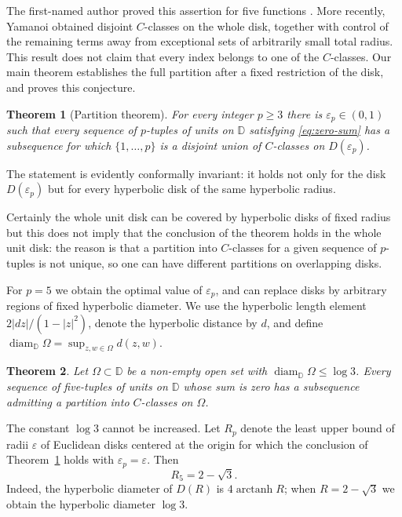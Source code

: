 \documentclass[12pt,letterpaper,reqno]{amsart}
\newtheorem{thm}{Theorem}[section]
\theoremstyle{definition}
\numberwithin{equation}{section}
\newcommand{\D}{\mathbb D}
\DeclareMathOperator{\diam}{diam}
\begin{document}
	The first-named author proved this assertion for five
	functions \cite{Ere96b}.
	More recently, Yamanoi \cite[Theorem~1.7]{Yam26} obtained disjoint
	$C$-classes on the whole disk, together with control of the
	remaining terms away from exceptional sets of arbitrarily small total
	radius. This result does not claim that every index belongs to one of
	the $C$-classes. Our main theorem establishes the full partition after a
	fixed restriction of the disk, and proves this conjecture.
	
	\begin{thm}[Partition theorem]\label{thm:main}
		For every integer $p\ge3$ there is $\varepsilon_p\in(0,1)$ such that
		every sequence of $p$-tuples of units on $\D$ satisfying
		\eqref{eq:zero-sum} has a subsequence for which $\{1,\ldots,p\}$ is a
		disjoint union of $C$-classes on $D(\varepsilon_p)$.
	\end{thm}
	
	The statement is evidently conformally invariant:
	it holds not only for the disk $D(\varepsilon_p)$ but for every hyperbolic disk
	of the same hyperbolic radius.
	
	Certainly the whole unit disk can be
	covered by hyperbolic disks of fixed radius
	but this does not imply that the conclusion of the theorem
	holds in the whole unit disk:
	the reason is that a partition into $C$-classes for a given sequence of
	$p$-tuples is not unique,
	so one can have different partitions on overlapping disks. 
	
	For $p=5$ we obtain the optimal value of $\varepsilon_p$, and can replace
	disks by arbitrary regions of fixed hyperbolic diameter.
	We use the hyperbolic length element
	$2|dz|/(1-|z|^2)$, denote the hyperbolic distance by $d$,
	and define $\diam_\D\Omega=\sup_{z,w\in\Omega}d(z,w)$.
	
	\begin{thm}\label{thm:sharp-five}
		Let $\Omega\subset\D$ be a non-empty open set
		with $\diam_{\D}\Omega\leq \log3$.
		Every sequence of five-tuples of
		units on $\D$ whose sum is zero has a subsequence admitting a
		partition into $C$-classes on $\Omega$.
	\end{thm}
	
	The constant $\log3$ cannot be increased. Let $R_p$ denote the
	least upper bound of radii $\varepsilon$ of Euclidean disks centered
	at the origin for which
	the conclusion of Theorem~\ref{thm:main} holds with $\varepsilon_p=\varepsilon$. Then
	\begin{equation*}
		R_5=2-\sqrt3.
	\end{equation*}
	Indeed, the hyperbolic diameter of $D(R)$ is $4\operatorname{arctanh}R$;
	when $R=2-\sqrt{3}$ we obtain the hyperbolic diameter $\log 3$.
	
\end{document}
